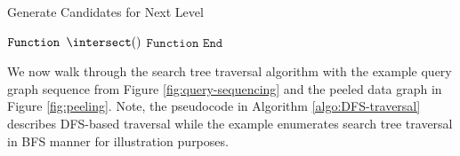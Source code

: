 \begin{algorithm}
    \caption{Generate Candidates for Next Level}
    \label{algo:intersect}
    $\texttt{Function }\intersect() $\newline
    $\texttt{Function End}$
\end{algorithm}

We now walk through the search tree traversal algorithm with the example query graph sequence from Figure \ref{fig:query-sequencing} and the peeled data graph in Figure \ref{fig:peeling}.
Note, the pseudocode in Algorithm \ref{algo:DFS-traversal} describes DFS-based traversal while the example enumerates search tree traversal in BFS manner for illustration purposes.


